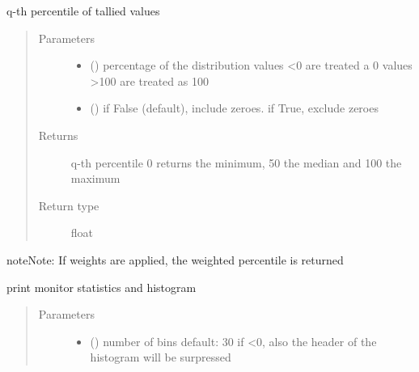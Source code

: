 \documentclass[letterpaper,10pt,english]{sphinxmanual}
\begin{document}
\begin{fulllineitems}
\begin{fulllineitems}
\end{fulllineitems}


\begin{fulllineitems}
\label{\detokenize{Reference:salabim.Monitor.percentile}}
q-th percentile of tallied values
\begin{quote}\begin{description}
\item[{Parameters}] \leavevmode\begin{itemize}
\item {} 
 () \textendash{} percentage of the distribution 
values \textless{}0 are treated a 0 
values \textgreater{}100 are treated as 100

\item {} 
 () \textendash{} if False (default), include zeroes. if True, exclude zeroes

\end{itemize}

\item[{Returns}] \leavevmode
q-th percentile 
0 returns the minimum, 50 the median and 100 the maximum

\item[{Return type}] \leavevmode
float

\end{description}\end{quote}

\begin{sphinxadmonition}{note}{Note:}
If weights are applied, the weighted percentile is returned
\end{sphinxadmonition}

\end{fulllineitems}


\begin{fulllineitems}
\label{\detokenize{Reference:salabim.Monitor.print_histogram}}
print monitor statistics and histogram
\begin{quote}\begin{description}
\item[{Parameters}] \leavevmode\begin{itemize}
\item {} 
 () \textendash{} number of bins 
default: 30 
if \textless{}0, also the header of the histogram will be surpressed


\end{itemize}
\end{description}
\end{quote}
\end{fulllineitems}
\end{fulllineitems}
\end{document}
